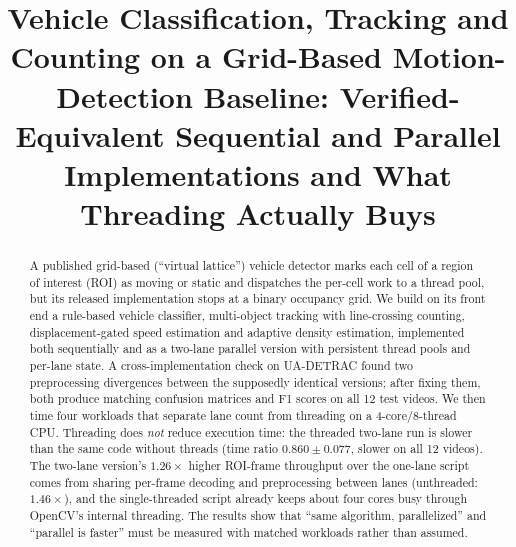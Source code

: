 \documentclass[conference]{IEEEtran}
\begin{document}
\title{Vehicle Classification, Tracking and Counting on a Grid-Based
Motion-Detection Baseline: Verified-Equivalent Sequential and Parallel
Implementations and What Threading Actually Buys}

\author{
\and
{}
}

\maketitle

\begin{abstract}
A published grid-based (``virtual lattice'') vehicle detector marks each
cell of a region of interest (ROI) as moving or static and dispatches
the per-cell work to a thread pool, but its released implementation stops
at a binary occupancy grid. We build on its front end a rule-based
vehicle classifier, multi-object tracking with line-crossing counting,
displacement-gated speed estimation and adaptive density estimation,
implemented both sequentially and as a two-lane parallel version with
persistent thread pools and per-lane state. A cross-implementation check
on UA-DETRAC found two preprocessing divergences between the supposedly
identical versions; after fixing them, both produce matching confusion
matrices and F1 scores on all 12 test videos. We then time four
workloads that separate lane count from threading on a 4-core/8-thread
CPU. Threading does \emph{not} reduce execution time: the threaded
two-lane run is slower than the same code without threads (time ratio
$0.860\pm0.077$, slower on all 12 videos). The two-lane version's
$1.26\times$ higher ROI-frame throughput over the one-lane script comes
from sharing per-frame decoding and preprocessing between lanes
(unthreaded: $1.46\times$), and the single-threaded script already keeps
about four cores busy through OpenCV's internal threading. The results
show that ``same algorithm, parallelized'' and ``parallel is faster''
must be measured with matched workloads rather than assumed.
\end{abstract}
\end{document}
